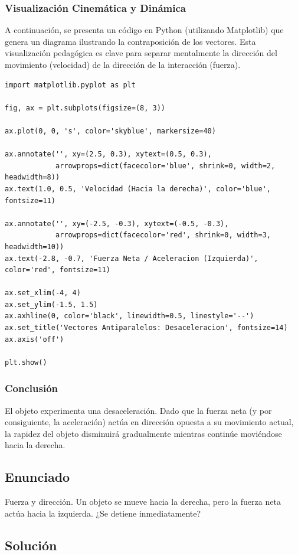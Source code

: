 \documentclass[12pt]{article}
\begin{document}
\subsubsection*{Visualización Cinemática y Dinámica}
A continuación, se presenta un código en Python (utilizando Matplotlib) que genera un diagrama ilustrando la contraposición de los vectores. Esta visualización pedagógica es clave para separar mentalmente la dirección del movimiento (velocidad) de la dirección de la interacción (fuerza).

\begin{lstlisting}
import matplotlib.pyplot as plt

fig, ax = plt.subplots(figsize=(8, 3))

ax.plot(0, 0, 's', color='skyblue', markersize=40)

ax.annotate('', xy=(2.5, 0.3), xytext=(0.5, 0.3), 
            arrowprops=dict(facecolor='blue', shrink=0, width=2, headwidth=8))
ax.text(1.0, 0.5, 'Velocidad (Hacia la derecha)', color='blue', fontsize=11)

ax.annotate('', xy=(-2.5, -0.3), xytext=(-0.5, -0.3), 
            arrowprops=dict(facecolor='red', shrink=0, width=3, headwidth=10))
ax.text(-2.8, -0.7, 'Fuerza Neta / Aceleracion (Izquierda)', color='red', fontsize=11)

ax.set_xlim(-4, 4)
ax.set_ylim(-1.5, 1.5)
ax.axhline(0, color='black', linewidth=0.5, linestyle='--')
ax.set_title('Vectores Antiparalelos: Desaceleracion', fontsize=14)
ax.axis('off')

plt.show()
\end{lstlisting}

\subsubsection*{Conclusión}
El objeto experimenta una desaceleración. Dado que la fuerza neta (y por consiguiente, la aceleración) actúa en dirección opuesta a su movimiento actual, la rapidez del objeto disminuirá gradualmente mientras continúe moviéndose hacia la derecha.

\newpage

\subsection*{Enunciado}
Fuerza y dirección. Un objeto se mueve hacia la derecha, pero la fuerza neta actúa hacia la izquierda. ¿Se detiene inmediatamente?

\subsection*{Solución}
\end{document}
